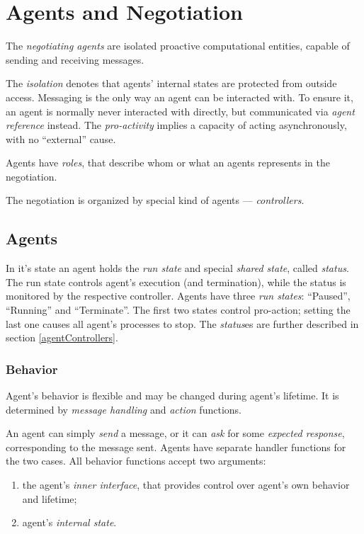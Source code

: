 %




\section{Agents and Negotiation}

The \emph{negotiating agents} are isolated proactive computational entities,
capable of sending and receiving messages.

The \emph{isolation} denotes that agents' internal states are protected
from outside access. Messaging is the only way an agent can be interacted with.
To ensure it, an agent is normally never interacted with directly, but 
communicated via \emph{agent reference} instead.
The \emph{pro-activity} implies a capacity of acting asynchronously, 
with no ``external'' cause.

Agents have \emph{roles}, that describe whom or what an agents represents
in the negotiation.

The negotiation is organized by special kind of agents --- \emph{controllers}.

\subsection{Agents}

In it's state an agent holds the \emph{run state} and special \emph{shared
  state}, called \emph{status}. The run state controls agent's execution
(and termination), while the status is monitored by the respective controller.
Agents have three \emph{run states}: ``Paused'', ``Running'' and ``Terminate''.
The first two states control pro-action; setting the last one causes all
agent's processes to stop. The \emph{status}es are further described in
section \ref{agentControllers}.

\subsubsection{Behavior}

Agent's behavior is flexible and may be changed during agent's lifetime.
It is determined by \emph{message handling} and \emph{action} functions.

An agent can simply \emph{send} a message, or it can \emph{ask} for some
\emph{expected response}, corresponding to the message sent. Agents have
separate handler functions for the two cases. All behavior functions
accept two arguments:
\begin{enumerate}
\item the agent's \emph{inner interface}, that provides
  control over agent's own behavior and lifetime;
\item agent's \emph{internal state}.
\end{enumerate}
 
